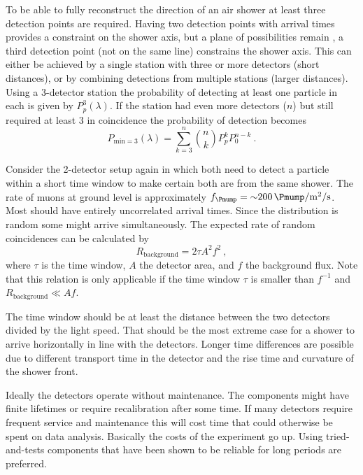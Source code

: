 To be able to fully reconstruct the direction of an air shower at least three detection points are required. Having two detection points with arrival times provides a constraint on the shower axis, but a plane of possibilities remain \cite{schultheiss2016pair}, a third detection point (not on the same line) constrains the shower axis. This can either be achieved by a single station with three or more detectors (short distances), or by combining detections from multiple stations (larger distances). Using a 3-detector station the probability of detecting at least one particle in each is given by $P_p^3(\lambda)$. If the station had even more detectors ($n$) but still required at least 3 in coincidence the probability of detection becomes
%
\begin{equation}
    P_{\mathrm{min}=3}(\lambda) = \sum_{k=3}^{n} \binom{n}{k} P_p^k P_0^{n-k} \ .
\end{equation}

Consider the 2-detector setup again in which both need to detect a particle within a short time window to make certain both are from the same shower. The rate of muons at ground level is approximately $f_{\Pmump} = \SI{~200}{\Pmump\per\meter\squared\per\second}$. Most should have entirely uncorrelated arrival times. Since the distribution is random some might arrive simultaneously. The expected rate of random coincidences can be calculated by
%
\begin{equation}
    \label{eq:background_rate}
    R_{\mathrm{background}} = 2 \tau A^2 f^2 \ ,
\end{equation}
%
where $\tau$ is the time window, $A$ the detector area, and $f$ the background flux. Note that this relation is only applicable if the time window $\tau$ is smaller than $f^{-1}$ and $R_{\mathrm{background}} \ll Af$.

The time window should be at least the distance between the two detectors divided by the light speed. That should be the most extreme case for a shower to arrive horizontally in line with the detectors. Longer time differences are possible due to different transport time in the detector and the rise time and curvature of the shower front.

Ideally the detectors operate without maintenance. The components might have finite lifetimes or require recalibration after some time. If many detectors require frequent service and maintenance this will cost time that could otherwise be spent on data analysis. Basically the costs of the experiment go up. Using tried-and-tests components that have been shown to be reliable for long periods are preferred.

